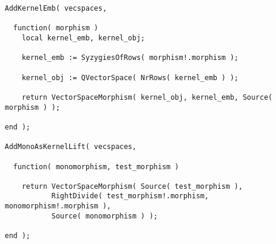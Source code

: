 \begin{small}
\begin{Verbatim}[frame=single]
AddKernelEmb( vecspaces,

  function( morphism )
    local kernel_emb, kernel_obj;
    
    kernel_emb := SyzygiesOfRows( morphism!.morphism );
    
    kernel_obj := QVectorSpace( NrRows( kernel_emb ) );
    
    return VectorSpaceMorphism( kernel_obj, kernel_emb, Source( morphism ) );
    
end );

AddMonoAsKernelLift( vecspaces,

  function( monomorphism, test_morphism )

    return VectorSpaceMorphism( Source( test_morphism ),
           RightDivide( test_morphism!.morphism, monomorphism!.morphism ),
           Source( monomorphism ) );

end );
\end{Verbatim}
\end{small}